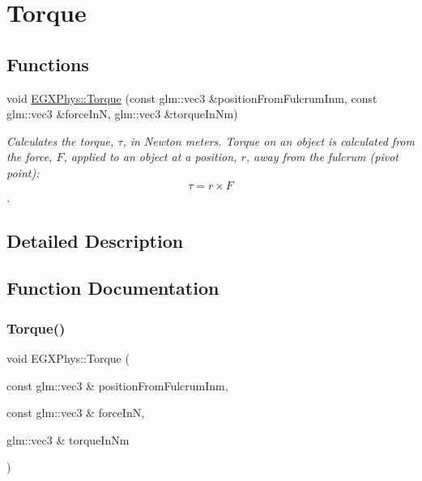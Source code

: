 \hypertarget{group___e_g_x_phys-_kinetics-_torque}{}\section{Torque}
\label{group___e_g_x_phys-_kinetics-_torque}
\subsection*{Functions}
\begin{DoxyCompactItemize}
\item 
void \mbox{\hyperlink{group___e_g_x_phys-_kinetics-_torque_ga12a787853cab88d40412c8290ca41c61}{E\+G\+X\+Phys\+::\+Torque}} (const glm\+::vec3 \&position\+From\+Fulcrum\+Inm, const glm\+::vec3 \&force\+InN, glm\+::vec3 \&torque\+In\+Nm)
\begin{DoxyCompactList}\small\item\em Calculates the torque, $\tau$, in Newton meters. Torque on an object is calculated from the force, $F$, applied to an object at a position, $r$, away from the fulcrum (pivot point)\+: \[\tau=r \times F \]. \end{DoxyCompactList}\end{DoxyCompactItemize}


\subsection{Detailed Description}


\subsection{Function Documentation}
\mbox{\label{group___e_g_x_phys-_kinetics-_torque_ga12a787853cab88d40412c8290ca41c61}} 
\subsubsection{\texorpdfstring{Torque()}{Torque()}}
{\footnotesize\ttfamily void E\+G\+X\+Phys\+::\+Torque (\begin{DoxyParamCaption}\item[{const glm\+::vec3 \&}]{position\+From\+Fulcrum\+Inm,  }\item[{const glm\+::vec3 \&}]{force\+InN,  }\item[{glm\+::vec3 \&}]{torque\+In\+Nm }\end{DoxyParamCaption})\hspace{0.3cm}{\ttfamily [inline]}}



